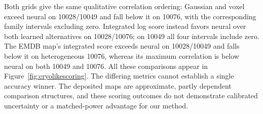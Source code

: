 Both grids give the same qualitative correlation ordering: Gaussian and voxel
exceed neural on 10028/10049 and fall below it on 10076, with the corresponding
family intervals excluding zero. Integrated log score instead favors neural
over both learned alternatives on 10028/10076; on 10049 all four intervals
include zero. The EMDB map's integrated score exceeds neural on 10028/10049
and falls below it on heterogeneous 10076, whereas its maximum correlation is
below neural on both 10049 and 10076. All these comparisons appear in
Figure~\ref{fig:cryolikescoring}. The differing metrics cannot establish a single
accuracy winner. The deposited maps are approximate, partly dependent
comparison structures, and these scoring outcomes do not demonstrate calibrated
uncertainty or a matched-power advantage for our method.
